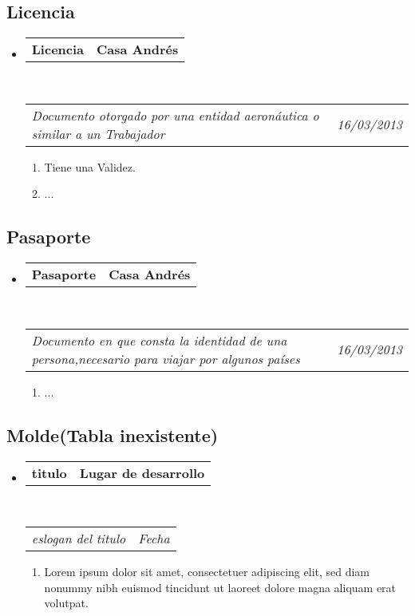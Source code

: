 \documentclass[10pt,letterpaper]{article}
\makeatletter
\newcommand{\headerrow}[2]
{\begin{tabular*}{\linewidth}{l@{\extracolsep{\fill}}r}
	#1 &
	#2 \\
\end{tabular*}}
\makeatother
\begin{document}
\subsection*{Licencia}

\begin{itemize}
	\parskip=0.1em

	\item
	\headerrow
		{\textbf{Licencia}}
		{\textbf{Casa Andrés}}
	\\
	\headerrow
		{\emph{Documento otorgado por una entidad aeronáutica o similar a un Trabajador}}
		{\emph{16/03/2013}}
	\begin{enumerate}
		\item Tiene una Validez.
		\item ...
	\end{enumerate}

\end{itemize}

\subsection*{Pasaporte}

\begin{itemize}
	\parskip=0.1em

	\item
	\headerrow
		{\textbf{Pasaporte}}
		{\textbf{Casa Andrés}}
	\\
	\headerrow
		{\emph{Documento en que consta la identidad de una persona,necesario para viajar por algunos países}}
		{\emph{16/03/2013}}
	\begin{enumerate}
		\item ...
	\end{enumerate}

\end{itemize}




\subsection*{Molde(Tabla inexistente)}

\begin{itemize}
	\parskip=0.1em

	\item
	\headerrow
		{\textbf{titulo}}
		{\textbf{Lugar de desarrollo}}
	\\
	\headerrow
		{\emph{eslogan del titulo}}
		{\emph{Fecha}}
	\begin{enumerate}
		\item Lorem ipsum dolor sit amet, consectetuer adipiscing elit, sed
		diam nonummy nibh euismod tincidunt ut laoreet dolore magna aliquam
		erat volutpat.
	\end{enumerate}

\end{itemize}
\end{document}

